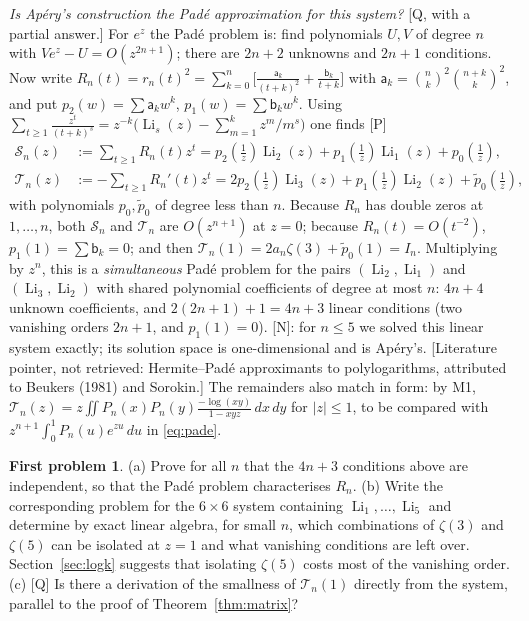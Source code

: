 \documentclass[11pt,a4paper]{article}
\newcommand{\dd}{\,d}
\newcommand{\Li}{\operatorname{Li}}
\newcommand{\st}[1]{\textsf{[#1]}}
\theoremstyle{definition}
\newtheorem*{problem}{First problem}
\begin{document}
\emph{Is Ap\'ery's construction the Pad\'e approximation for this system?} \st{Q, with a partial
answer.} For $e^z$ the Pad\'e problem is: find polynomials $U,V$ of degree $n$ with
$Ve^z-U=O(z^{2n+1})$; there are $2n+2$ unknowns and $2n+1$ conditions. Now write
$R_n(t)=r_n(t)^2=\sum_{k=0}^n\bigl[\frac{\mathsf a_k}{(t+k)^2}+\frac{\mathsf b_k}{t+k}\bigr]$ with
$\mathsf a_k=\binom nk^2\binom{n+k}k^2$, and put $p_2(w)=\sum\mathsf a_kw^k$, $p_1(w)=\sum\mathsf b_kw^k$. Using
$\sum_{t\ge1}\frac{z^t}{(t+k)^s}=z^{-k}\bigl(\Li_s(z)-\sum_{m=1}^kz^m/m^s\bigr)$ one finds \st{P}
\begin{align*}
\mathcal S_n(z)&:=\sum_{t\ge1}R_n(t)z^t=p_2(\tfrac1z)\Li_2(z)+p_1(\tfrac1z)\Li_1(z)+p_0(\tfrac1z),\\
\mathcal T_n(z)&:=-\sum_{t\ge1}R_n'(t)z^t=2p_2(\tfrac1z)\Li_3(z)+p_1(\tfrac1z)\Li_2(z)+\tilde p_0(\tfrac1z),
\end{align*}
with polynomials $p_0,\tilde p_0$ of degree less than $n$. Because $R_n$ has double zeros at
$1,\dots,n$, both $\mathcal S_n$ and $\mathcal T_n$ are $O(z^{n+1})$ at $z=0$; because $R_n(t)=O(t^{-2})$,
$p_1(1)=\sum\mathsf b_k=0$; and then $\mathcal T_n(1)=2a_n\zeta(3)+\tilde p_0(1)=I_n$. Multiplying by $z^n$, this is
a \emph{simultaneous} Pad\'e problem for the pairs $(\Li_2,\Li_1)$ and $(\Li_3,\Li_2)$ with shared
polynomial coefficients of degree at most $n$: $4n+4$ unknown coefficients, and $2(2n+1)+1=4n+3$ linear conditions (two
vanishing orders $2n+1$, and $p_1(1)=0$). \st{N}: for $n\le5$ we solved this linear system exactly;
its solution space is one-dimensional and is Ap\'ery's. \st{Literature pointer, not retrieved:
Hermite--Pad\'e approximants to polylogarithms, attributed to Beukers (1981) and Sorokin.} The
remainders also match in form: by M1, $\mathcal T_n(z)=z\iint P_n(x)P_n(y)\frac{-\log(xy)}{1-xyz}\dd x\dd y$
for $|z|\le1$, to be compared with $z^{n+1}\int_0^1P_n(u)e^{zu}\dd u$ in \eqref{eq:pade}.

\begin{problem}
(a) Prove for all $n$ that the $4n+3$ conditions above are independent, so that the Pad\'e problem
characterises $R_n$. (b) Write the corresponding problem for the $6\times6$ system containing
$\Li_1,\dots,\Li_5$ and determine by exact linear algebra, for small $n$, which combinations of
$\zeta(3)$ and $\zeta(5)$ can be isolated at $z=1$ and what vanishing conditions are left over.
Section~\ref{sec:logk} suggests that isolating $\zeta(5)$ costs most of the vanishing order.
(c) \st{Q} Is there a derivation of the smallness of $\mathcal T_n(1)$ directly from the system, parallel to
the proof of Theorem~\ref{thm:matrix}?
\end{problem}
\end{document}
